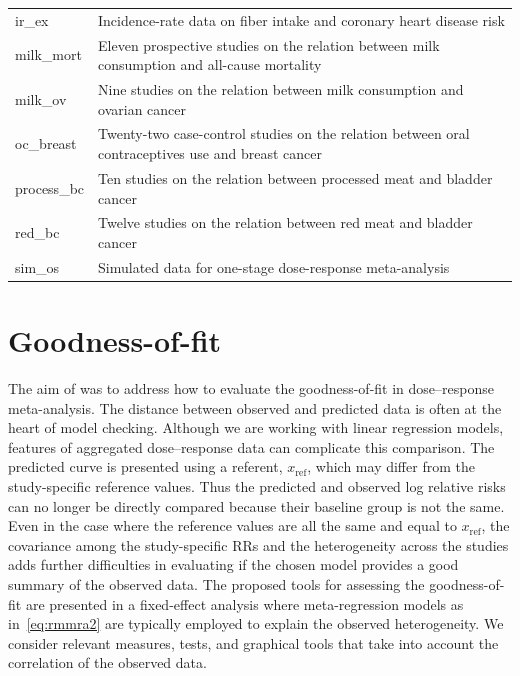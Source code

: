 \documentclass[11pt,a4paper,twoside,openany]{book}\usepackage{knitr}
\begin{document}
{{\begin{knitrout}
\begin{table}
\begin{tabular}[t]{l>{\raggedright\arraybackslash}p{32em}}
ir\_ex & Incidence-rate data on fiber intake and coronary heart disease risk \citep{orsini2006generalized}\\
\addlinespace
milk\_mort & Eleven prospective studies on the relation between milk consumption and all-cause mortality \citep{larsson2015milk}\\
milk\_ov & Nine studies on the relation between milk consumption and ovarian cancer \citep{larsson2006milk}\\
oc\_breast & Twenty-two case-control studies on the relation between oral contraceptives use and breast cancer \citep{berlin1993meta}\\
process\_bc & Ten studies on the relation between processed meat and bladder cancer \citep{crippa2016red}\\
red\_bc & Twelve studies on the relation between red meat and bladder cancer \citep{crippa2016red}\\
sim\_os & Simulated data for one-stage dose-response meta-analysis \citep{crippa2018one}\\
\bottomrule
\end{tabular}
\end{table}


\end{knitrout}


\section{Goodness-of-fit}\label{sec:gof}

The aim of  was to address how to evaluate the goodness-of-fit in dose--response meta-analysis.
The distance between observed and predicted data is often at the heart of model checking.
Although we are working with linear regression models, features of aggregated dose--response data can complicate this comparison. The predicted curve is presented using a referent, $x_\mathrm{ref}$, which may differ from the study-specific reference values. Thus the predicted and observed log relative risks can no longer be directly compared because their baseline group is not the same. Even in the case where the reference values are all the same and equal to $x_\mathrm{ref}$, the covariance among the study-specific RRs and the heterogeneity across the studies adds further difficulties in evaluating if the chosen model provides a good summary of the observed data. The proposed tools for assessing the goodness-of-fit are presented in a fixed-effect analysis where meta-regression models as in~\ref{eq:rmmra2} are typically employed to explain the observed heterogeneity. We consider relevant measures, tests, and graphical tools that take into account the correlation of the observed data.

}}
\end{document}
